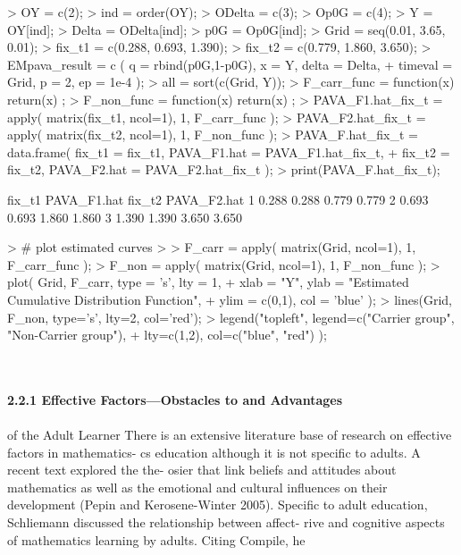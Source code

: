 \documentclass{article}
\begin{document}
\begin{Schunk}
\begin{Sinput}
> OY = c(2);
> ind = order(OY);
> ODelta = c(3);
> Op0G = c(4);
> Y = OY[ind];
> Delta = ODelta[ind];
> p0G = Op0G[ind];
> Grid = seq(0.01, 3.65, 0.01);
> fix_t1 = c(0.288, 0.693, 1.390);
> fix_t2 = c(0.779, 1.860, 3.650);
> EMpava_result = c ( q = rbind(p0G,1-p0G), x = Y, delta = Delta, 
+                                timeval = Grid, p = 2, ep = 1e-4 );
> all = sort(c(Grid, Y));
> F_carr_func = function(x){  return(x)  };
> F_non_func  = function(x){  return(x)  };
> PAVA_F1.hat_fix_t = apply( matrix(fix_t1, ncol=1), 1, F_carr_func );
> PAVA_F2.hat_fix_t = apply( matrix(fix_t2, ncol=1), 1, F_non_func );
> PAVA_F.hat_fix_t = data.frame( fix_t1 = fix_t1, PAVA_F1.hat = PAVA_F1.hat_fix_t,
+                                fix_t2 = fix_t2, PAVA_F2.hat = PAVA_F2.hat_fix_t  );
> print(PAVA_F.hat_fix_t);
\end{Sinput}
\begin{Soutput}
  fix_t1 PAVA_F1.hat fix_t2 PAVA_F2.hat
1  0.288       0.288  0.779       0.779
2  0.693       0.693  1.860       1.860
3  1.390       1.390  3.650       3.650
\end{Soutput}
\begin{Sinput}
> # plot estimated curves
> 
> F_carr = apply( matrix(Grid, ncol=1), 1, F_carr_func );
> F_non = apply( matrix(Grid, ncol=1), 1, F_non_func );
> plot( Grid, F_carr, type = 's', lty = 1, 
+       xlab = "Y", ylab = "Estimated Cumulative Distribution Function",
+       ylim = c(0,1), col = 'blue' );
> lines(Grid, F_non, type='s', lty=2, col='red');
> legend("topleft", legend=c("Carrier group", "Non-Carrier group"),
+        lty=c(1,2), col=c("blue", "red") );
\end{Sinput}
\end{Schunk}
\textit{\\\\}
\textbf{ 2.2.1 Effective Factors—Obstacles to and Advantages }
\textit{\\\\}
 of the Adult Learner
 There is an extensive literature base of research on effective factors in mathematics-
   cs education although it is not specific to adults. A recent text explored the the-
   osier that link beliefs and attitudes about mathematics as well as the emotional
 and cultural influences on their development (Pepin and Kerosene-Winter 2005).
 Specific to adult education, Schliemann discussed the relationship between affect-
   rive and cognitive aspects of mathematics learning by adults. Citing Compile, he
\end{document}
